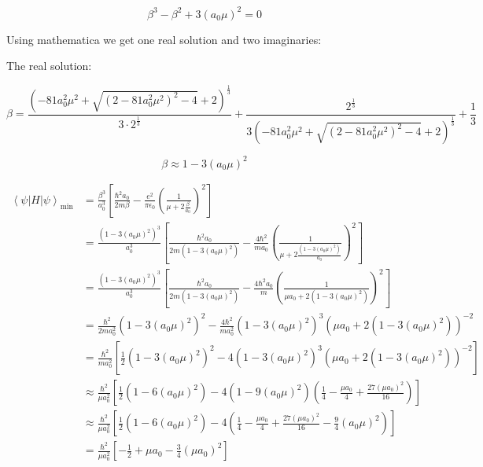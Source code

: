 \documentclass[12pt]{article}
\begin{document}
\[
    \beta^3 - \beta^2 + 3 (a_0\mu)^2 = 0
\]

Using mathematica we get one real solution and two imaginaries:

The real solution:

\[
    \beta = \frac{\left(-81 a_0^2 \mu^2 + \sqrt{\left(2 - 81 a_0^2 \mu^2\right)^2 - 4} + 2\right)^{\frac{1}{3}}}{3 \cdot 2^{\frac{1}{3}}} + \frac{2^{\frac{1}{3}}}{3 \left(-81 a_0^2 \mu^2 + \sqrt{\left(2 - 81 a_0^2 \mu^2\right)^2 - 4} + 2\right)^{\frac{1}{3}}} + \frac{1}{3}
\]

\[
    \beta \approx 1 - 3 (a_0\mu)^2
\]

\begin{equation*}
    \begin{split}
        {\left\langle \psi \left| H \right| \psi \right\rangle}_{\min}
         & = \frac{\beta^3}{a_0^3} \left[\frac{\hbar^2 a_0}{2m \beta} - \frac{e^2}{\pi \epsilon_0}\left(\frac{1}{\mu+2\frac{\beta}{a_0}}\right)^2 \right]                                     \\
         & = \frac{(1 - 3 (a_0\mu)^2)^3}{a_0^3} \left[\frac{\hbar^2 a_0}{2m (1 - 3 (a_0\mu)^2)} - \frac{4 \hbar^2}{m a_0}\left(\frac{1}{\mu+2\frac{(1 - 3 (a_0\mu)^2)}{a_0}}\right)^2 \right] \\
         & = \frac{(1 - 3 (a_0\mu)^2)^3}{a_0^3} \left[\frac{\hbar^2 a_0}{2m (1 - 3 (a_0\mu)^2)} - \frac{4 \hbar^2 a_0}{m}\left(\frac{1}{\mu a_0+2(1 - 3 (a_0\mu)^2)}\right)^2 \right]         \\
         & = \frac{\hbar^2}{2m a_0^2}(1 - 3 (a_0\mu)^2)^2 - \frac{4\hbar^2 }{m a_0^2}(1 - 3 (a_0\mu)^2)^3(\mu a_0+2(1 - 3 (a_0\mu)^2))^{-2}                                                   \\
         & = \frac{\hbar^2}{m a_0^2} \left[\frac{1}{2}(1 - 3 (a_0\mu)^2)^2 - 4(1 - 3 (a_0\mu)^2)^3(\mu a_0+2(1 - 3 (a_0\mu)^2))^{-2} \right]                                                  \\
         & \approx \frac{\hbar^2}{\mu a_0^2} \left[\frac{1}{2}(1 - 6 (a_0\mu)^2) - 4(1 - 9 (a_0\mu)^2)(\frac{1}{4}-\frac{\mu a_0}{4} +\frac{27 (\mu a_0)^2}{16}) \right]                      \\
         & \approx \frac{\hbar^2}{\mu a_0^2} \left[\frac{1}{2}(1 - 6 (a_0\mu)^2) - 4(\frac{1}{4}-\frac{\mu a_0}{4} +\frac{27 (\mu a_0)^2}{16} -\frac{9}{4}(a_0\mu)^2) \right]                 \\
         & = \frac{\hbar^2}{\mu a_0^2} \left[-\frac{1}{2} + \mu a_0 - \frac{3}{4}(\mu a_0)^2 \right]
    \end{split}
\end{equation*}
\end{document}
